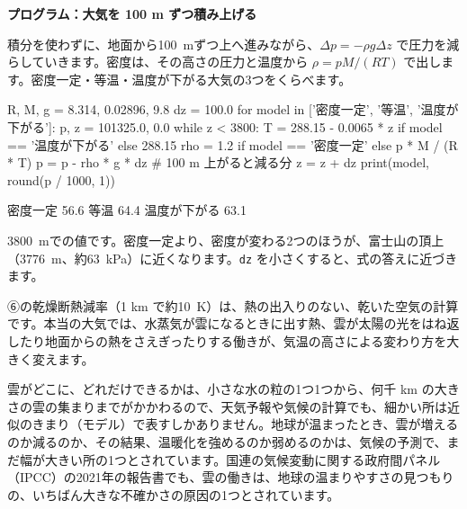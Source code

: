 \noindent\textbf{プログラム：大気を 100 m ずつ積み上げる}\par\nobreak
積分を使わずに、地面から\qty{100}{m}ずつ上へ進みながら、$\Delta p=-\rho g\Delta z$ で圧力を減らしていきます。密度は、その高さの圧力と温度から $\rho=pM/(RT)$ で出します。密度一定・等温・温度が下がる大気の3つをくらべます。
\begin{phcode}[Python]
R, M, g = 8.314, 0.02896, 9.8
dz = 100.0
for model in ['密度一定', '等温', '温度が下がる']:
    p, z = 101325.0, 0.0
    while z < 3800:
        T = 288.15 - 0.0065 * z if model == '温度が下がる' else 288.15
        rho = 1.2 if model == '密度一定' else p * M / (R * T)
        p = p - rho * g * dz        \# 100 m 上がると減る分
        z = z + dz
    print(model, round(p / 1000, 1))
\end{phcode}
\begin{phcodeout}
密度一定 56.6
等温 64.4
温度が下がる 63.1
\end{phcodeout}
\qty{3800}{m}での値です。密度一定より、密度が変わる2つのほうが、富士山の頂上（\qty{3776}{m}、約\qty{63}{kPa}）に近くなります。\texttt{dz} を小さくすると、式の答えに近づきます。

\begin{phmada}
⑥の乾燥断熱減率（1 km で約\qty{10}{K}）は、熱の出入りのない、乾いた空気の計算です。本当の大気では、水蒸気が雲になるときに出す熱、雲が太陽の光をはね返したり地面からの熱をさえぎったりする働きが、気温の高さによる変わり方を大きく変えます。

雲がどこに、どれだけできるかは、小さな水の粒の1つ1つから、何千 km の大きさの雲の集まりまでがかかわるので、天気予報や気候の計算でも、細かい所は近似のきまり（モデル）で表すしかありません。地球が温まったとき、雲が増えるのか減るのか、その結果、温暖化を強めるのか弱めるのかは、気候の予測で、まだ幅が大きい所の1つとされています。国連の気候変動に関する政府間パネル（IPCC）の2021年の報告書でも、雲の働きは、地球の温まりやすさの見つもりの、いちばん大きな不確かさの原因の1つとされています。
\end{phmada}


